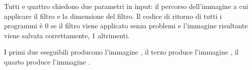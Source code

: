 \documentclass[10pt]{myarticle}
\begin{document}
Tutti e quattro chiedono due parametri in input: il percorso dell'immagine a cui applicare il filtro e la dimensione del filtro.
Il codice di ritorno di tutti i programmi \`e 0 se il filtro viene applicato senza problemi e l'immagine risultante viene salvata correttamente, 1 altrimenti.

I primi due eseguibili producono l'immagine , il terzo produce l'immagine , il quarto produce l'immagine .

\renewcommand{\refname}{Riferimenti}

\printbibliography
\end{document}
